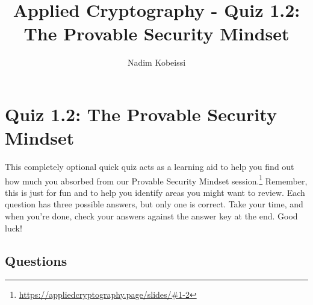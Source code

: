 \documentclass[10pt,a4paper,american]{exam}
\title{Applied Cryptography - Quiz 1.2: The Provable Security Mindset}
\author{Nadim Kobeissi}
\begin{document}
\classhandoutheader
\section*{Quiz 1.2: The Provable Security Mindset}

\begin{tcolorbox}[colframe=OliveGreen!30!white,colback=OliveGreen!5!white]
	This completely optional quick quiz acts as a learning aid to help you find out how much you absorbed from our Provable Security Mindset session.\footnote{\url{https://appliedcryptography.page/slides/\#1-2}} Remember, this is just for fun and to help you identify areas you might want to review. Each question has three possible answers, but only one is correct. Take your time, and when you're done, check your answers against the answer key at the end. Good luck!
\end{tcolorbox}

\subsection*{Questions}
\end{document}
